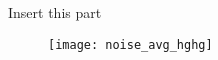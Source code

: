 Insert this part

\begin{figure}[!h]
  \centering
    \texttt{[image: noise\_avg\_hghg]}
    \caption{}
    \label{fig:noise_avg_hghg}
\end{figure}
